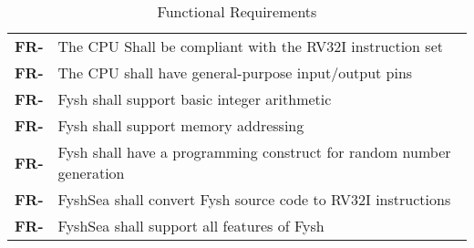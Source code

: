 \resetfyshcounter
\newcommand{\fr}[1]{%
	\textbf{FR-\rc} & #1 \\%
	\hline%
}
\begin{table}[H]
	\begin{tabularx}{\textwidth}{| a | x |}
		\hline
		 &  \\
		\hline
		\fr{The CPU Shall be compliant with the RV32I instruction set}
		\fr{The CPU shall have general-purpose input/output pins}
		\fr{Fysh shall support basic integer arithmetic}
		\fr{Fysh shall support memory addressing}
		\fr{Fysh shall have a programming construct for random number generation}
		\fr{FyshSea shall convert Fysh source code to RV32I instructions}
		\fr{FyshSea shall support all features of Fysh}
	\end{tabularx}
	\caption{Functional Requirements}
\end{table}

